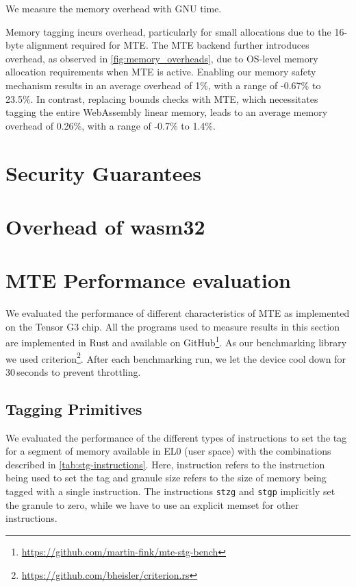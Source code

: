 We measure the memory overhead with GNU time.

Memory tagging incurs overhead, particularly for small allocations due to the 16-byte alignment required for MTE.
The MTE backend further introduces overhead, as observed in \cref{fig:memory_overheads}, due to OS-level memory allocation requirements when MTE is active.
Enabling our memory safety mechanism results in an average overhead of 1\%, with a range of -0.67\% to 23.5\%.
In contrast, replacing bounds checks with MTE, which necessitates tagging the entire WebAssembly linear memory, leads to an average memory overhead of 0.26\%, with a range of -0.7\% to 1.4\%.


\section{Security Guarantees}\label{sec:security-guarantees}




\section{Overhead of wasm32}
\label{sec:eval-wasm32-wasm64}



\section{MTE Performance evaluation}
\label{sec:mte-performance-evaluation}

We evaluated the performance of different characteristics of \ac{MTE} as implemented on the Tensor G3 chip.
All the programs used to measure results in this section are implemented in Rust and available on GitHub\footnote{\url{https://github.com/martin-fink/mte-stg-bench}}.
As our benchmarking library we used criterion\footnote{\url{https://github.com/bheisler/criterion.rs}}.
After each benchmarking run, we let the device cool down for 30\,seconds to prevent throttling.

\subsection{Tagging Primitives}
\label{subsec:tagging-primitives}

We evaluated the performance of the different types of instructions to set the tag for a segment of memory available in EL0 (user space) with the combinations described in \cref{tab:stg-instructions}.
Here, instruction refers to the instruction being used to set the tag and granule size refers to the size of memory being tagged with a single instruction.
The instructions \texttt{stzg} and \texttt{stgp} implicitly set the granule to zero, while we have to use an explicit memset for other instructions.

